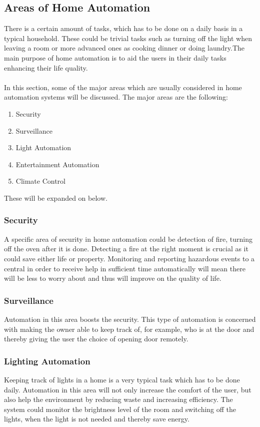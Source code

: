 \subsection{Areas of Home Automation}
\label{sec:Areas of Home Automation}
There is a certain amount of tasks, which has to be done on a daily basis in a typical household.
These could be trivial tasks such as turning off the light when leaving a room or more advanced ones as cooking dinner or
doing laundry.The main purpose of home automation is to aid the users in their daily tasks enhancing their life quality.
\\\\
In this section, some of the major areas which are usually considered in home automation systems will be discussed.
The major areas are the following:

\begin{enumerate}
  \item Security
  \item Surveillance
  \item Light Automation
  \item Entertainment Automation
  \item Climate Control
\end{enumerate}
These will be expanded on below.

\subsubsection{Security}
\label{sub:Security}
A specific area of security in home automation could be detection of fire, turning off the oven after it is done.
Detecting a fire at the right moment is crucial as it could save either life or property.
Monitoring and reporting hazardous events to a central in order to receive help in sufficient time automatically
will mean there will be less to worry about and thus will improve on the quality of life.

\subsubsection{Surveillance}
\label{sub:Surveillance}
Automation in this area boosts the security.
This type of automation is concerned with making the owner able to keep track of, for example, who is at the door and
thereby giving the user the choice of opening door remotely.

\subsubsection{Lighting Automation}
\label{sub:Lighting Automation}
Keeping track of lights in a home is a very typical task which has to be done daily.
Automation in this area will not only increase the comfort of the user, but also help the environment by reducing waste and
increasing efficiency. The system could monitor the brightness level of the room and switching off the lights,
when the light is not needed and thereby save energy.

